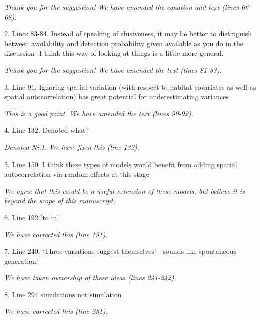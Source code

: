 \documentclass[12pt,english]{article}
\begin{document}
\begin{spacing}{1.9}
\begin{flushleft}
\vspace{0.5cm}
\textit{Thank you for the suggestion!  We have amended the equation and text (lines 66-68).}
\vspace{0.5cm}

2. Lines 83-84. Instead of speaking of elusiveness, it may be better to distinguish between availability 
and detection probability given available as you do in the discussion- I think this way of looking at things is a little more general.

\vspace{0.5cm}
\textit{Thank you for the suggestion!  We have amended the text (lines 81-83).}
\vspace{0.5cm}

3. Line 91. Ignoring spatial variation (with respect to habitat covariates as well as spatial autocorrelation) has great potential for underestimating variances

\vspace{0.5cm}
\textit{This is a good point.  We have amended the text (lines 90-92).} 
\vspace{0.5cm}

4. Line 132. Denoted what?

\vspace{0.5cm}
\textit{Denoted Ni,1.  We have fixed this (line 132).}
\vspace{0.5cm}

5. Line 150. I think these types of models would benefit from adding spatial autocorrelation via random effects at this stage

\vspace{0.5cm}
\textit{We agree that this would be a useful extension of these models, but believe it is beyond the scope of this manuscript.}
\vspace{0.5cm}

6. Line 192 'to in'

\vspace{0.5cm}
\textit{We have corrected this (line 191).}
\vspace{0.5cm}

7. Line 240. `Three variations suggest themselves' - sounds like spontaneous generation!

\vspace{0.5cm}
\textit{We have taken ownership of these ideas (lines 241-242).}
\vspace{0.5cm}

8. Line 294 simulations not simulation

\vspace{0.5cm}
\textit{We have corrected this (line 281).}
\vspace{0.5cm}
\end{flushleft}
\end{spacing}
\end{document}
